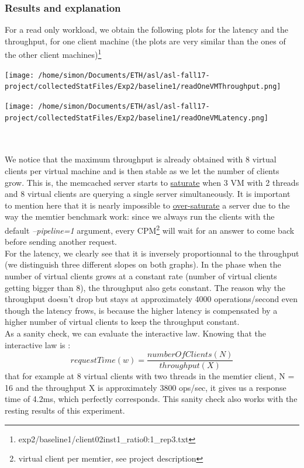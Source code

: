 \documentclass[11pt,a4paper]{article}
\begin{document}
\subsubsection{Results and explanation}
For a read only workload, we obtain the following plots for the latency and the throughput, for one client machine (the plots are very similar than the ones of the other client machines)\footnote{exp2/baseline1/client02inst1\_ratio0:1\_rep3.txt}
\\
\begin{minipage}{0.5\linewidth}
\texttt{[image: /home/simon/Documents/ETH/asl/asl-fall17-project/collectedStatFiles/Exp2/baseline1/readOneVMThroughput.png]}
\end{minipage}
\hfill
\begin{minipage}{0.5\linewidth}
\texttt{[image: /home/simon/Documents/ETH/asl/asl-fall17-project/collectedStatFiles/Exp2/baseline1/readOneVMLatency.png]}
\end{minipage}
\\\\
We notice that the maximum throughput is already obtained with 8 virtual clients per virtual machine and is then stable as we let the number of clients grow. This is, the memcached server starts to \underline{saturate} when 3 VM with 2 threads and 8 virtual clients are querying a single server simultaneously. It is important to mention here that it is nearly impossible to \underline{over-saturate} a server due to the way the memtier benchmark work: since we always run the clients with the default \textit{--pipeline=1} argument, every CPM\footnote{virtual client per memtier, see project description} will wait for an answer to come back before sending another request.
\\
For the latency, we clearly see that it is inversely proportionnal to the throughput (we distinguish three different slopes on both graphs). In the phase when the number of virtual clients grows at a constant rate (number of virtual clients getting bigger than 8), the throughput also gets constant. The reason why the throughput doesn't drop but stays at approximately 4000 operations/second even though the latency frows, is because the higher latency is compensated by a higher number of virtual clients to keep the throughput constant. 
\\As a sanity check, we can evaluate the interactive law. Knowing that the interactive law is : \[ request Time (w) = \frac{number Of Clients (N)}{throughput (X)}\] that for example at 8 virtual clients with two threads in the memtier client, N = 16 and the throughput X is approximately 3800 ops/sec, it gives us a response time of 4.2ms, which perfectly corresponds. This sanity check also works with the resting results of this experiment. 
\end{document}
